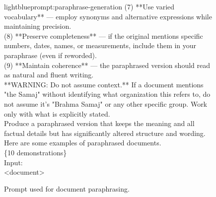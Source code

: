 \documentclass{applemlr}
\numberwithin{equation}{section}
\begin{document}
\begin{figure}[t]
\begin{minipage}{0.95\textwidth}
\begin{promptbox}[\color{black}{Prompt for Document Paraphrasing}]{lightblue}{prompt:paraphrase-generation}
(7) **Use varied vocabulary** — employ synonyms and alternative expressions while maintaining precision. \\[4pt]

(8) **Preserve completeness** — if the original mentions specific numbers, dates, names, or measurements, include them in your paraphrase (even if reworded). \\[4pt]

(9) **Maintain coherence** — the paraphrased version should read as natural and fluent writing. \\[4pt]

**WARNING: Do not assume context.** If a document mentions "the Samaj" without identifying what organization this refers to, do not assume it's "Brahma Samaj" or any other specific group. Work only with what is explicitly stated. \\[4pt]

Produce a paraphrased version that keeps the meaning and all factual details but has significantly altered structure and wording. \\[4pt]

Here are some examples of paraphrased documents. \\[2pt]
\{10 demonstrations\} \\[4pt]
Input: \\[2pt]
<document>
\end{promptbox}
\end{minipage}
\caption{Prompt used for document paraphrasing.}
\label{prompt_paraphrase_generation}
\end{figure}
\end{document}
